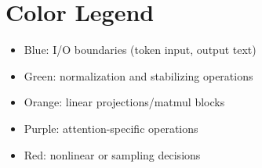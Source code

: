 \documentclass[11pt]{article}
\begin{document}
\section{Color Legend}
\begin{itemize}[leftmargin=*]
  \item \textcolor{blue!70!black}{Blue}: I/O boundaries (token input, output text)
  \item \textcolor{green!50!black}{Green}: normalization and stabilizing operations
  \item \textcolor{orange!85!black}{Orange}: linear projections/matmul blocks
  \item \textcolor{purple!70!black}{Purple}: attention-specific operations
  \item \textcolor{red!70!black}{Red}: nonlinear or sampling decisions
\end{itemize}
\end{document}
